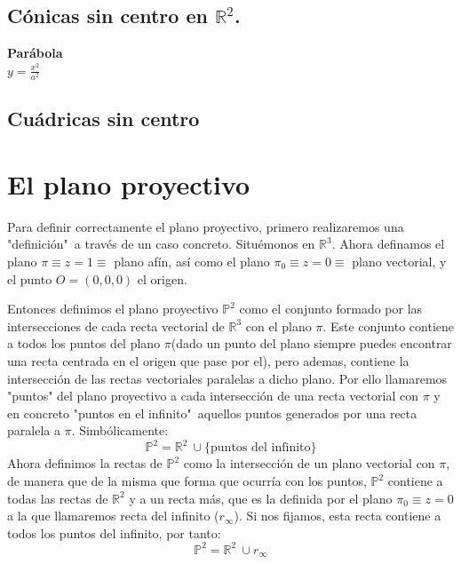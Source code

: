 \documentclass[11pt, a4paper]{article}
\newif\IfInSansMode
\let\oldsf\sffamily
\renewcommand*{\sffamily}{\oldsf\mathversion{sans}\InSansModetrue}
\theoremstyle{theorem-style}
\theoremstyle{definition-style}
\theoremstyle{remark-style}
\theoremstyle{example-style}
\begin{document}
\subsection{Cónicas sin centro en $\mathbb{R}^2$.}


\begin{minipage}[c]{0.45\textwidth}
  {\bf Parábola}\vspace{1em}\\
  $\displaystyle y = \frac{x^2}{a^2}$
\end{minipage}\hfill
\begin{minipage}[]{0.35\textwidth}
\end{minipage}



\subsection{Cuádricas sin centro}

\newpage

\section{El plano proyectivo}

Para definir correctamente el plano proyectivo, primero realizaremos una "definición"\ a través de un caso concreto. Situémonos en $\mathbb{R}^3$. Ahora definamos el plano $\pi \equiv z = 1 \equiv$ plano afín, así como el plano $\pi_0 \equiv z = 0 \equiv$ plano vectorial, y el punto $O = (0,0,0)$ el origen.


Entonces definimos el plano proyectivo $\mathbb{P}^2$ como el conjunto formado por las intersecciones de cada recta vectorial de $\mathbb{R}^3$ con el plano $\pi$. Este conjunto contiene a todos los puntos del plano $\pi$(dado un punto del plano siempre puedes encontrar una recta centrada en el origen que pase por el), pero ademas, contiene la intersección de las rectas vectoriales paralelas a dicho plano. Por ello llamaremos "puntos" del plano proyectivo a cada intersección de una recta vectorial con $\pi$ y en concreto "puntos en el infinito"\ aquellos puntos generados por una recta paralela a $\pi$. Simbólicamente:
$$\mathbb{P}^2 = \mathbb{R}^2\ \cup \{\text{puntos del infinito}\}$$
Ahora definimos la rectas de $\mathbb{P}^2$ como la intersección de un plano vectorial con $\pi$, de manera que de la misma que forma que ocurría con los puntos, $\mathbb{P}^2$ contiene a todas las rectas de $\mathbb{R}^2$ y a un recta más, que es la definida por el plano $\pi_0 \equiv z= 0$ a la que llamaremos recta del infinito ($r_\infty$). Si nos fijamos, esta recta contiene a todos los puntos del infinito, por tanto:
$$\mathbb{P}^2 = \mathbb{R}^2\ \cup r_\infty$$
\end{document}
